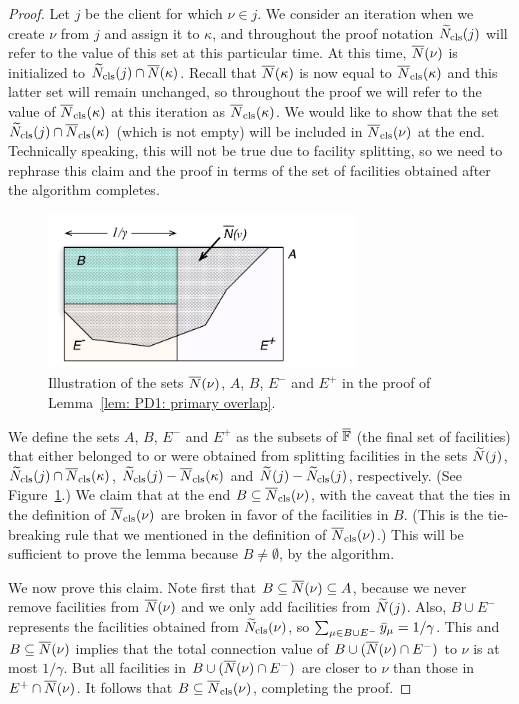 \begin{proof}
Let $j$ be the client for which $\nu\in j$. We consider an iteration when we create $\nu$
from $j$ and assign it to $\kappa$, and throughout the proof notation ${\widetilde N}_{\text{cls}}(j)$ 
will refer to the value of this set at this particular time.
At this time, ${\overline{N}}(\nu)$ is initialized to ${\widetilde N}_{\text{cls}}(j)\cap {\overline{N}}(\kappa)$.
Recall that
${\overline{N}}(\kappa)$ is now equal to ${\overline{N}}_{\text{cls}}(\kappa)$ and this latter set will remain unchanged,
so throughout the proof we will refer to the value of ${\overline{N}}_{\text{cls}}(\kappa)$ at this iteration
as ${\overline{N}}_{\text{cls}}(\kappa)$.
We would like to show that the set ${\widetilde N}_{\text{cls}}(j)\cap {\overline{N}}_{\text{cls}}(\kappa)$ (which is
not empty) will
be included in ${\overline{N}}_{\text{cls}}(\nu)$ at the end. Technically speaking, this will not be
true due to facility splitting, so we need to rephrase this claim and the proof
in terms of the set of facilities obtained after the algorithm completes.

\begin{figure}[ht]
\begin{center}
\includegraphics[width=3.2in]{./FIGURES/proof_of_lemma_PD'3a.pdf}
\caption{Illustration of the sets ${\overline{N}}(\nu)$, $A$, $B$, $E^-$ and $E^+$ in the proof
of Lemma~\ref{lem: PD1: primary overlap}.}
\label{fig: sets lemma PD'3a}
\end{center}
\end{figure}

We define the sets $A$, $B$, $E^-$ and $E^+$ as the subsets of $\overline{\mathbb{F}}$ (the final set
of facilities) that either belonged to or were obtained from splitting facilities in
the sets ${\widetilde N}(j)$, ${\widetilde N}_{\text{cls}}(j)\cap {\overline{N}}_{\text{cls}}(\kappa)$, 
${\widetilde N}_{\text{cls}}(j) - {\overline{N}}_{\text{cls}}(\kappa)$
and ${\widetilde N}(j) - {\widetilde N}_{\text{cls}}(j)$, respectively.
(See Figure~\ref{fig: sets lemma PD'3a}.)
We claim that at the end $B\subseteq {\overline{N}}_{\text{cls}}(\nu)$, with the caveat that the
ties in the definition of ${\overline{N}}_{\text{cls}}(\nu)$ are broken in favor of the facilities in $B$.
(This is the tie-breaking rule that we mentioned in the definition of ${\overline{N}}_{\text{cls}}(\nu)$.)
This will be sufficient to prove the lemma because $B\neq\emptyset$, by the algorithm.

We now prove this claim. Note first that 
$B\subseteq {\overline{N}}(\nu) \subseteq A$, because we never remove facilities from
${\overline{N}}(\nu)$ and we only add facilities from ${\widetilde N}(j)$.
Also, $B\cup E^-$ represents the facilities obtained from ${\widetilde N}_{\text{cls}}(\nu)$, so
 $\sum_{\mu\in B\cup E^-} {\bar y}_{\mu} = 1/\gamma$. 
This and
$B\subseteq {\overline{N}}(\nu)$ implies that the total connection value of
$B\cup ({\overline{N}}(\nu)\cap E^-)$ to $\nu$ is at most $1/\gamma$. But
all facilities in $B\cup ({\overline{N}}(\nu)\cap E^-)$ are closer to $\nu$ than
those in $E^+\cap {\overline{N}}(\nu)$. It follows that
$B\subseteq {\overline{N}}_{\text{cls}}(\nu)$, completing the proof.
\end{proof}

